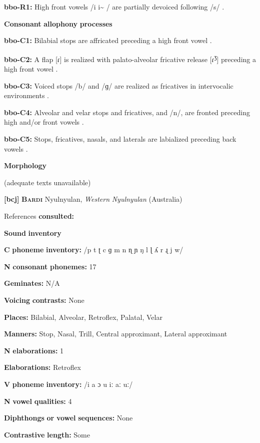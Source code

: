 \begin{styleBody}
\textbf{bbo-R1:} High front vowels /i i\~{} / are partially devoiced following /s/ \citep[28-9]{Morse1976}.

\textbf{Consonant} \textbf{allophony} \textbf{processes}

\textbf{bbo-C1:} Bilabial stops are affricated preceding a high front vowel \citep[20]{Morse1976}.

\textbf{bbo-C2:} A flap [ɾ] is realized with palato-alveolar fricative release [ɾ\textsuperscript{ʒ}] preceding a high front vowel \citep[25]{Morse1976}.

\textbf{bbo-C3:} Voiced stops /b/ and /ɡ/ are realized as fricatives in intervocalic environments \citep[22]{Morse1976}.

\textbf{bbo-C4:} Alveolar and velar stops and fricatives, and /n/, are fronted preceding high and/or front vowels \citep[20-23]{Morse1976}.

\textbf{bbo-C5:} Stops, fricatives, nasals, and laterals are labialized preceding back vowels \citep[20]{Morse1976}.

\textbf{Morphology}

(adequate texts unavailable)

\textbf{[bcj]}   \textbf{\textsc{Bardi}  }  Nyulnyulan, \textit{Western} \textit{Nyulnyulan} (Australia)

References \textbf{consulted:} \citet{Bowern2012}

\textbf{Sound} \textbf{inventory}

\textbf{C} \textbf{phoneme} \textbf{inventory:} /p t ʈ c ɡ m n ɳ ɲ ŋ l ɭ ʎ r ɻ j w/

\textbf{N} \textbf{consonant} \textbf{phonemes:} 17

\textbf{Geminates:} N/A

\textbf{Voicing} \textbf{contrasts:} None

\textbf{Places:} Bilabial, Alveolar, Retroflex, Palatal, Velar

\textbf{Manners:} Stop, Nasal, Trill, Central approximant, Lateral approximant

\textbf{N} \textbf{elaborations:} 1

\textbf{Elaborations:} Retroflex

\textbf{V} \textbf{phoneme} \textbf{inventory:} /i a ɔ u iː aː uː/

\textbf{N} \textbf{vowel} \textbf{qualities:} 4

\textbf{Diphthongs} \textbf{or} \textbf{vowel} \textbf{sequences:} None

\textbf{Contrastive} \textbf{length:} Some


\end{styleBody}
